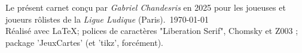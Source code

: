 \documentclass[a5paper,french]{article}
\begin{document}
Le présent carnet conçu par \emph{Gabriel Chandesris} en 2025 pour les joueuses et joueurs rôlistes de la \emph{Ligue Ludique} (Paris).~\today~\\

Réalisé avec \LaTeX ; polices de caractères "Liberation Serif", {\setmainfont{Chomsky} Chomsky } et { \setmainfont{Z003} Z003 } ; package 'JeuxCartes' (et 'tikz', forcément). 
  
\end{document}
